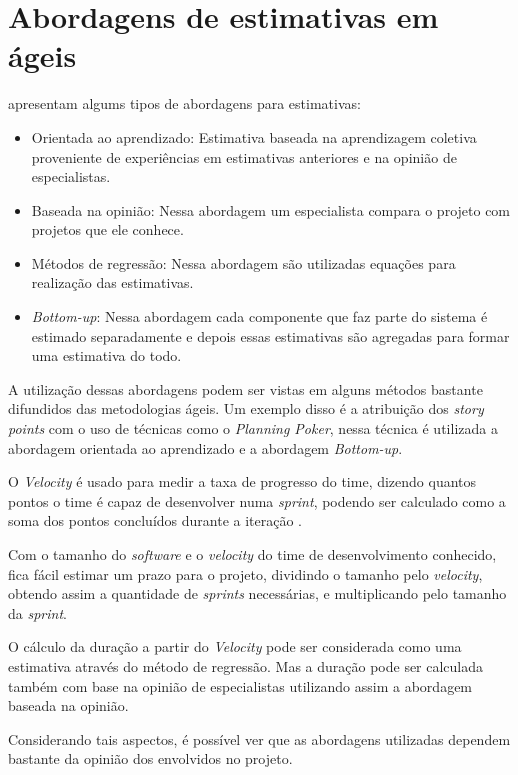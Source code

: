 \section{Abordagens de estimativas em ágeis}

   apresentam algums tipos de abordagens para estimativas:

  \begin{itemize}

    \item Orientada ao aprendizado: Estimativa baseada na aprendizagem coletiva proveniente de experiências em estimativas anteriores e 
    na opinião de especialistas. 

    \item Baseada na opinião: Nessa abordagem um especialista compara o projeto com projetos que ele conhece.

    \item Métodos de regressão: Nessa abordagem são utilizadas equações para realização das estimativas.

    \item \textit{Bottom-up}: Nessa abordagem cada componente que faz parte do sistema é estimado separadamente e depois essas estimativas são agregadas para formar uma estimativa do todo.

  \end{itemize}

  A utilização dessas abordagens podem ser vistas em alguns métodos bastante difundidos das metodologias ágeis. Um exemplo disso é a atribuição dos \textit{story points} com o uso de técnicas como o \textit{Planning Poker}, nessa técnica é utilizada a abordagem orientada ao aprendizado e a abordagem \textit{Bottom-up}.

  O \textit{Velocity} é usado para medir a taxa de progresso do time, dizendo quantos pontos o time é capaz de desenvolver
  numa \textit{sprint}, podendo ser calculado como a soma dos pontos concluídos durante a iteração \cite{cohn06}. 
  
  Com o tamanho do \textit{software} e o \textit{velocity} do time de desenvolvimento conhecido, fica fácil estimar um prazo para o projeto, dividindo o tamanho pelo \textit{velocity}, obtendo assim a quantidade de \textit{sprints} necessárias, e multiplicando pelo tamanho da \textit{sprint}. \cite{cohn06}

  O cálculo da duração a partir do \textit{Velocity} pode ser considerada como uma estimativa através do método de regressão. Mas a duração
  pode ser calculada também com base na opinião de especialistas utilizando assim a abordagem baseada na opinião.

  Considerando tais aspectos, é possível ver que as abordagens utilizadas dependem bastante da opinião dos envolvidos no projeto.
